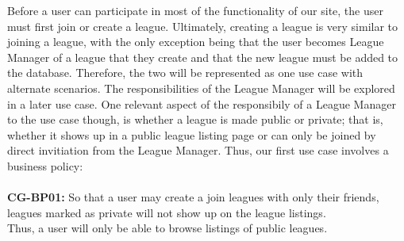
Before a user can participate in most of the functionality of our site, the user must first join or create a league. Ultimately, creating a league is very similar to joining a league, with the only exception being that the user becomes League Manager of a league that they create and that the new league must be added to the database. Therefore, the two will be represented as one use case with alternate scenarios. The responsibilities of the League Manager will be explored in a later use case. One relevant aspect of the responsibily of a League Manager to the use case though, is whether a league is made public or private; that is, whether it shows up in a public league listing page or can only be joined by direct invitiation from the League Manager. Thus, our first use case involves a business policy: \\ \\
\textbf{CG-BP01:} So that a user may create a join leagues with only their friends, leagues marked as private will not show up on the league listings. \\

Thus, a user will only be able to browse listings of public leagues. \\

